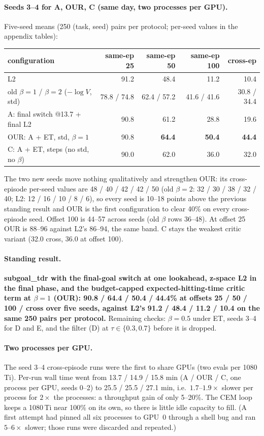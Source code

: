 \documentclass[11pt]{article}
\begin{document}
\paragraph{Seeds 3--4 for A, OUR, C (same day, two processes per GPU).} Five-seed means
(250 (task, seed) pairs per protocol; per-seed values in the appendix tables):
\begin{center}\small
\begin{tabular}{lrrrr}
\toprule
configuration & same-ep 25 & same-ep 50 & same-ep 100 & cross-ep \\
\midrule
L2 & 91.2 & 48.4 & 11.2 & 10.4 \\
old $\beta=1$ / $\beta=2$ ($-\log V$, std) & 78.8 / 74.8 & 62.4 / 57.2 & 41.6 / 41.6 & 30.8 / 34.4 \\
A: final switch @13.7 + final L2 & 90.8 & 61.2 & 28.8 & 19.6 \\
OUR: A + ET, std, $\beta=1$ & 90.8 & \textbf{64.4} & \textbf{50.4} & \textbf{44.4} \\
C: A + ET, steps (no std, no $\beta$) & 90.0 & 62.0 & 36.0 & 32.0 \\
\bottomrule
\end{tabular}
\end{center}
The two new seeds move nothing qualitatively and strengthen OUR: its cross-episode
per-seed values are 48 / 40 / 42 / 42 / 50 (old $\beta=2$: 32 / 30 / 38 / 32 / 40; L2:
12 / 16 / 10 / 8 / 6), so every seed is 10--18 points above the previous standing result
and OUR is the first configuration to clear 40\% on every cross-episode seed. Offset 100 is
44--57 across seeds (old $\beta$ rows 36--48). At offset 25 OUR is 88--96 against L2's 86--94,
the same band. C stays the weakest critic variant (32.0 cross, 36.0 at offset 100).

\paragraph{Standing result.} \textbf{subgoal\_tdr with the final-goal switch at one lookahead,
z-space L2 in the final phase, and the budget-capped expected-hitting-time critic term at
$\beta=1$ (OUR): 90.8 / 64.4 / 50.4 / 44.4\% at offsets 25 / 50 / 100 / cross over
five seeds, against L2's 91.2 / 48.4 / 11.2 / 10.4 on the same 250 pairs per protocol.}
Remaining checks: $\beta=0.5$ under ET, seeds 3--4 for D and E, and the filter (D) at
$\tau\in\{0.3,0.7\}$ before it is dropped.

\paragraph{Two processes per GPU.} The seed 3--4 cross-episode runs were the first to share
GPUs (two evals per 1080\,Ti). Per-run wall time went from 13.7 / 14.9 / 15.8 min (A / OUR / C,
one process per GPU, seeds 0--2) to 25.5 / 25.5 / 27.1 min, i.e.\ $1.7$--$1.9\times$ slower per
process for $2\times$ the processes: a throughput gain of only 5--20\%. The CEM loop keeps a
1080\,Ti near 100\% on its own, so there is little idle capacity to fill. (A first attempt
had pinned all six processes to GPU~0 through a shell bug and ran $5$--$6\times$ slower; those
runs were discarded and repeated.)
\end{document}
